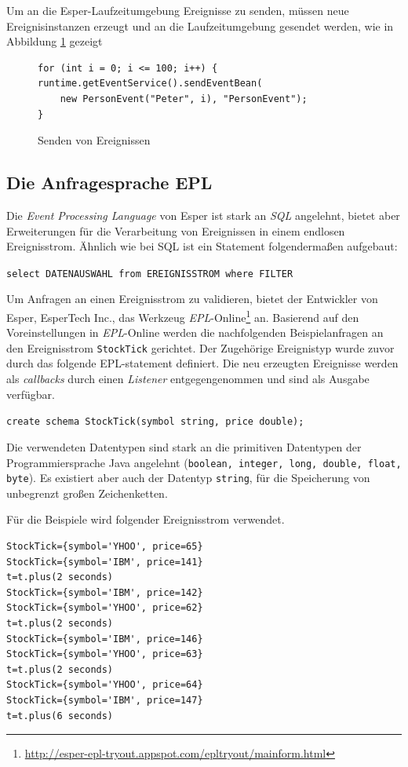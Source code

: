 \documentclass{acm_proc_article-sp}
\begin{document}
Um an die Esper-Laufzeitumgebung Ereignisse zu senden, müssen neue Ereignisinstanzen 
erzeugt und an die Laufzeitumgebung gesendet werden, wie in Abbildung \ref{java:03}
gezeigt

\begin{figure}[H]    
\begin{verbatim}
for (int i = 0; i <= 100; i++) {
runtime.getEventService().sendEventBean(
    new PersonEvent("Peter", i), "PersonEvent");
}
\end{verbatim}
\caption{Senden von Ereignissen}
\label{java:03}
\end{figure}

\subsection{Die Anfragesprache EPL}\label{kap:epl}
\vspace{0.1cm}
Die \textit{Event Processing Language} von Esper ist stark an \textit{SQL} angelehnt, 
bietet aber Erweiterungen für die Verarbeitung von Ereignissen in einem endlosen 
Ereignisstrom. Ähnlich wie bei SQL ist ein Statement folgendermaßen aufgebaut:

\texttt{select DATENAUSWAHL from EREIGNISSTROM where FILTER}

Um Anfragen an einen Ereignisstrom zu validieren, bietet der Entwickler von Esper, 
EsperTech Inc., das Werkzeug 
\textit{EPL}-Online\footnote{\url{http://esper-epl-tryout.appspot.com/epltryout/mainform.html}}
an. Basierend auf den 
Voreinstellungen in \textit{EPL}-Online werden die nachfolgenden Beispielanfragen an den 
Ereignisstrom \texttt{StockTick} gerichtet. Der Zugehörige Ereignistyp wurde zuvor durch 
das folgende EPL-statement definiert. Die neu erzeugten Ereignisse werden als 
\textit{callbacks} durch einen \textit{Listener} entgegengenommen und sind als Ausgabe 
verfügbar.

\texttt{create schema StockTick(symbol string, price double);}

Die verwendeten Datentypen sind stark an die primitiven Datentypen der Programmiersprache 
Java angelehnt (\texttt{boolean, integer, long, double, float, byte}). Es existiert aber 
auch der Datentyp \texttt{string}, für die Speicherung von unbegrenzt großen 
Zeichenketten.

Für die Beispiele wird folgender Ereignisstrom verwendet.

\begin{verbatim}
StockTick={symbol='YHOO', price=65}
StockTick={symbol='IBM', price=141}
t=t.plus(2 seconds)
StockTick={symbol='IBM', price=142}
StockTick={symbol='YHOO', price=62}
t=t.plus(2 seconds)
StockTick={symbol='IBM', price=146}
StockTick={symbol='YHOO', price=63}
t=t.plus(2 seconds)
StockTick={symbol='YHOO', price=64}
StockTick={symbol='IBM', price=147}
t=t.plus(6 seconds)
\end{verbatim}
\end{document}
